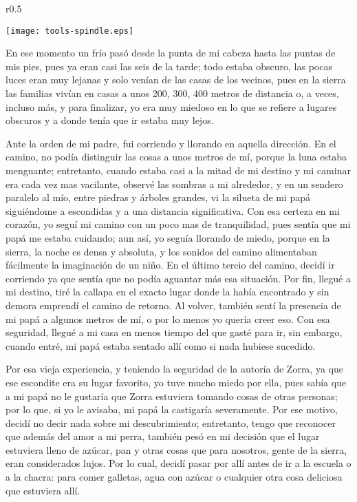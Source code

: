 \ifdefined\EnableIncludeImages
\begin{wrapfigure}{r}{0.5\textwidth}
  \begin{center}
    \texttt{[image: tools-spindle.eps]}
  \end{center}
\end{wrapfigure}
\fi
En ese momento un frío pasó desde la punta de mi cabeza hasta las puntas de mis pies, pues ya eran casi las seis de la tarde; todo estaba obscuro, las pocas luces eran muy lejanas y solo venían de las casas de los vecinos, pues en la sierra las familias vivían en casas a unos 200, 300, 400 metros de distancia o, a veces, incluso más, y para finalizar, yo era muy miedoso en lo que se refiere a lugares obscuros y a donde tenía que ir estaba muy lejos.

Ante la orden de mi padre, fui corriendo y llorando en aquella dirección. En el camino, no podía distinguir las cosas a unos metros de mí, porque la luna estaba menguante; entretanto, cuando estaba casi a la mitad de mi destino y mi caminar era cada vez mas vacilante, observé las sombras a mi alrededor, y en un sendero paralelo al mío, entre piedras y árboles grandes, vi la silueta de mi papá siguiéndome a escondidas y a una distancia significativa.
Con esa certeza en mi corazón, yo seguí mi camino con un poco mas de tranquilidad, pues sentía que mi papá me estaba cuidando; aun así, yo seguía llorando de miedo, porque en la sierra, la noche es densa y absoluta, y los sonidos del camino alimentaban fácilmente la imaginación de un niño.
En el último tercio del camino, decidí ir corriendo ya que sentía que no podía aguantar más esa situación. Por fin, llegué a mi destino, tiré la callapa en el exacto lugar donde la había encontrado y sin demora emprendí el camino de retorno.
Al volver, también sentí la presencia de mi papá a algunos metros de mí, o por lo menos yo quería creer eso. Con esa seguridad, llegué a mi casa en menos tiempo del que gasté para ir, sin embargo, cuando entré, mi papá estaba sentado allí como si nada hubiese sucedido.

Por esa vieja experiencia, y teniendo la seguridad de la autoría de Zorra, ya que ese escondite era su lugar favorito, yo tuve mucho miedo por ella, pues sabía que a mi papá no le gustaría que Zorra estuviera tomando cosas de otras personas; por lo que, si yo le avisaba, mi papá la castigaría severamente. Por ese motivo, decidí no decir nada sobre mi descubrimiento; entretanto, tengo que reconocer que además del amor a mi perra, también pesó en mi decisión que el lugar estuviera lleno de azúcar, pan y otras cosas que para nosotros, gente de la sierra, eran considerados lujos.
Por lo cual, decidí pasar por allí antes de ir a la escuela o a la chacra: para comer galletas, agua con azúcar o cualquier otra cosa deliciosa que estuviera allí.

